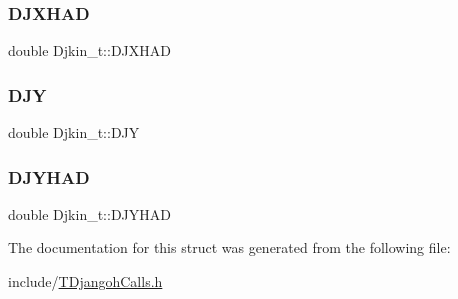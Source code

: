 \subsubsection{\texorpdfstring{D\+J\+X\+H\+AD}{DJXHAD}}
{\footnotesize\ttfamily double Djkin\+\_\+t\+::\+D\+J\+X\+H\+AD}

\mbox{\label{struct_djkin__t_aafc30d1a65485334fd983b244c5ad09b}} 
\subsubsection{\texorpdfstring{D\+JY}{DJY}}
{\footnotesize\ttfamily double Djkin\+\_\+t\+::\+D\+JY}

\mbox{\label{struct_djkin__t_acb3aa9109215ecdd8fc000059755bd72}} 
\subsubsection{\texorpdfstring{D\+J\+Y\+H\+AD}{DJYHAD}}
{\footnotesize\ttfamily double Djkin\+\_\+t\+::\+D\+J\+Y\+H\+AD}



The documentation for this struct was generated from the following file\+:\begin{DoxyCompactItemize}
\item 
include/\hyperlink{_t_djangoh_calls_8h}{T\+Djangoh\+Calls.\+h}\end{DoxyCompactItemize}
